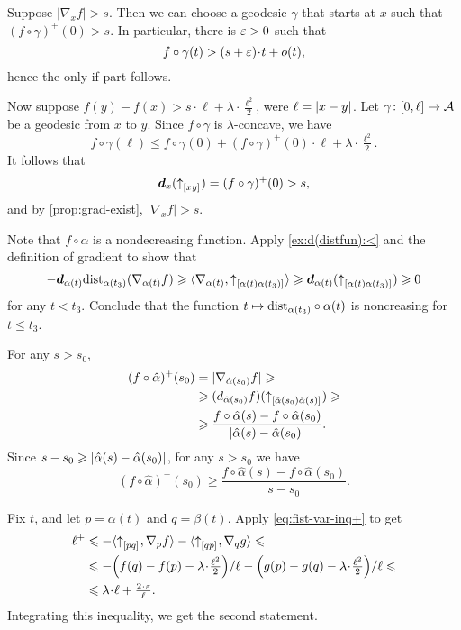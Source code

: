 Suppose $|\nabla_xf|> s$.
Then we can choose a geodesic $\gamma$ that starts at $x$ such that 
$(f\circ\gamma)^+(0)>s$.
In particular, there is $\varepsilon>0$ such that
\[f\circ\gamma(t)>(s+\eps)\cdot t+o(t),\]
hence the only-if part follows.

Now suppose $f(y)-f(x)>s\cdot \ell+\lambda\cdot \tfrac{\ell^2}2$,
were $\ell=|{x}-{y}|_{}^{{}}$.
Let $\gamma\colon[0,\ell]\to \mathcal{A}$ be a geodesic from $x$ to $y$.
Since $f\circ\gamma$ is $\lambda$-concave, we have
\[f\circ\gamma(\ell)\le f\circ\gamma(0)+(f\circ\gamma)^+(0)\cdot\ell+\lambda\cdot \tfrac{\ell^2}2.\]
It follows that 
\[\bm{d}_x({\uparrow}_{[{x}{y}]_{{}}})=(f\circ\gamma)^+(0)>s,\]
and by \ref{prop:grad-exist}, $|\nabla_x f|>s$.

Note that $f\circ\alpha$ is a nondecreasing function.
Apply \ref{ex:d(distfun):<} and the definition of gradient to show that
\[
-\bm{d}_{\alpha(t)}\mathrm{dist}_{\alpha(t_3)}(\nabla_{\alpha(t)}f)
\geqslant
\langle \nabla_{\alpha(t)},{\uparrow}_{[{\alpha(t)}{\alpha(t_3)}]_{{}}}\rangle
\geqslant
\bm{d}_{\alpha(t)}({\uparrow}_{[{\alpha(t)}{\alpha(t_3)}]_{{}}})
\geqslant0
\]
for any $t<t_3$.
Conclude that the function 
$t\mapsto \mathrm{dist}_{\alpha(t_3)}\circ\alpha(t)$ is noncreasing for $t\le t_3$.

For any $s>s_0$,
\begin{align*}
(f\circ\hat\alpha)^+(s_0)&=|\nabla_{\hat\alpha(s_0)}f|
\geqslant
\\
&\geqslant
(d_{\hat\alpha(s_0)}f)({\uparrow}_{[{\hat\alpha(s_0)}{\hat\alpha(s)}]_{{}}})
\geqslant
\\
&\geqslant
\frac{f\circ\hat\alpha(s)-f\circ\hat\alpha(s_0)}{|{\hat\alpha(s)}-{\hat\alpha(s_0)}|_{}^{{}}}.
\end{align*} 
Since $s-s_0\geqslant|{\hat\alpha(s)}-{\hat\alpha(s_0)}|_{}^{{}}$, for any $s>s_0$ we have 
\[(f\circ\hat\alpha)^+(s_0)\ge
\frac{f\circ\hat\alpha(s)-f\circ\hat\alpha(s_0)}{s-s_0}.\]

Fix $t$, and let $p=\alpha(t)$ and $q=\beta(t)$.
Apply \ref{eq:fist-var-inq+} to get
\begin{align*}
 \ell^+
&\le -\<\dir{p}{q},\nabla_{p}f\>
-\<\dir{q}{p},\nabla_{q}g\>
\le
\\
&\le -{\left({f(q)}-{f(p)}-\lambda\cdot\tfrac{\ell^2}2\right)}/{\ell}
-{\left({g(p)}-{g(q)}-\lambda\cdot\tfrac{\ell^2}2\right)}/{\ell}\le
\\
&\le \lambda\cdot\ell+\tfrac{2\cdot\eps}{\ell}.
\end{align*}
Integrating this inequality, we get the second statement.

